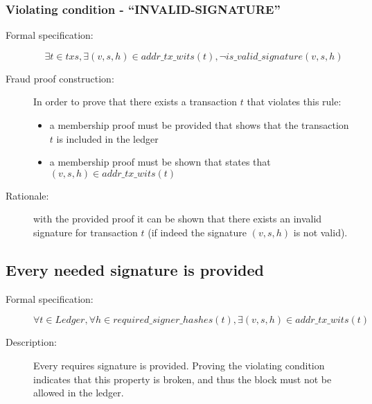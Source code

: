 \documentclass[../midgard.tex]{subfiles}
\begin{document}
\subsubsection{Violating condition - ``INVALID-SIGNATURE''}
\label{sec:INVALID-SIGNATURE}

\begin{description}

\item[Formal specification:]
\begin{equation*}
    \exists t \in txs, \exists (v, s, h) \in addr\_tx\_wits(t), \lnot is\_valid\_signature(v, s, h)
\end{equation*}

\item[Fraud proof construction:] In order to prove that there exists a transaction $t$ that violates this rule:
\begin{itemize}
    \item a membership proof must be provided that shows that the transaction $t$ is included in the ledger
    \item a membership proof must be shown that states that $(v, s, h) \in addr\_tx\_wits(t)$
\end{itemize}

\item[Rationale:] with the provided proof it can be shown that there exists an invalid signature for transaction $t$ (if indeed the signature $(v, s, h)$ is not valid).

\end{description}

\subsection{Every needed signature is provided}

\begin{description}

\item[Formal specification:]
\begin{equation*}
    \forall t \in Ledger, \forall h \in required\_signer\_hashes(t), \exists (v, s, h) \in addr\_tx\_wits(t)
\end{equation*}
        
\item[Description:] Every requires signature is provided.
  Proving the violating condition indicates that this property is broken, and thus the block must not be allowed in the ledger.

\end{description}
\end{document}
